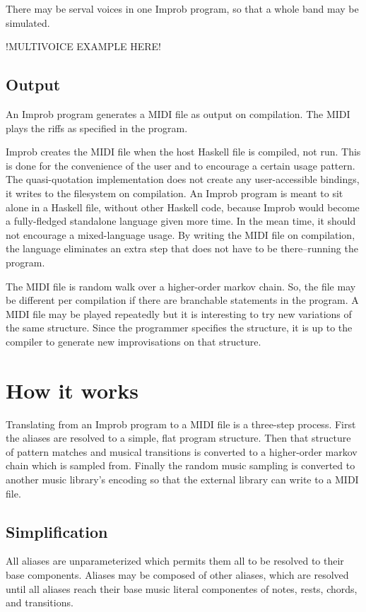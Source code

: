 \documentclass{sigplanconf-pldi15}
\begin{document}
There may be serval voices in one Improb program, so that a whole band may be simulated.

!MULTIVOICE EXAMPLE HERE!

\subsection{Output}
An Improb program generates a MIDI file as output on compilation. The MIDI plays the riffs as specified in the program.

Improb creates the MIDI file when the host Haskell file is compiled, not run. This is done for the convenience of the user and to encourage a certain usage pattern. The quasi-quotation implementation does not create any user-accessible bindings, it writes to the filesystem on compilation. An Improb program is meant to sit alone in a Haskell file, without other Haskell code, because Improb would become a fully-fledged standalone language given more time. In the mean time, it should not encourage a mixed-language usage. By writing the MIDI file on compilation, the language eliminates an extra step that does not have to be there--running the program.

The MIDI file is random walk over a higher-order markov chain. So, the file may be different per compilation if there are branchable statements in the program. A MIDI file may be played repeatedly but it is interesting to try new variations of the same structure. Since the programmer specifies the structure, it is up to the compiler to generate new improvisations on that structure.

\section{How it works}
Translating from an Improb program to a MIDI file is a three-step process. First the aliases are resolved to a simple, flat program structure. Then that structure of pattern matches and musical transitions is converted to a higher-order markov chain which is sampled from. Finally the random music sampling is converted to another music library's encoding so that the external library can write to a MIDI file.

\subsection{Simplification}
All aliases are unparameterized which permits them all to be resolved to their base components. Aliases may be composed of other aliases, which are resolved until all aliases reach their base music literal componentes of notes, rests, chords, and transitions.
\end{document}
